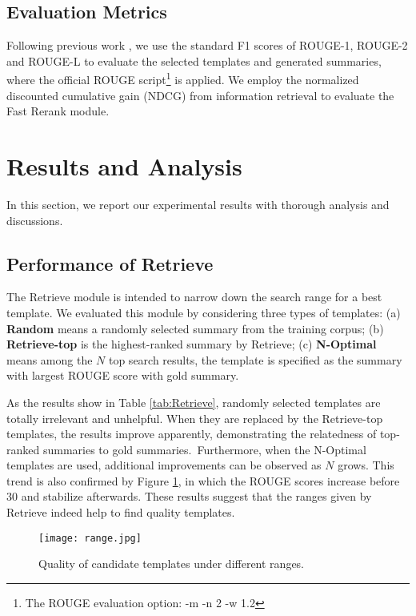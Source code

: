 \documentclass[11pt,a4paper]{article}
\begin{document}
\begin{spacing}{1.0}
\subsection{Evaluation Metrics}
Following previous work \cite{Nallapati2016Abstractive,Zhou2017Selective,cao2018retrieve}, we use the standard F1 scores of ROUGE-1, ROUGE-2 and ROUGE-L \cite{Lin2003Automatic} to evaluate the selected templates and generated summaries, where the official ROUGE script\footnote{The ROUGE evaluation option: -m -n 2 -w 1.2} is applied. We employ the normalized discounted cumulative gain (NDCG) \cite{jarvelin2002cumulated} from information retrieval to evaluate the Fast Rerank module.

\section{Results and Analysis}
In this section, we report our experimental results with thorough analysis and discussions.

\subsection{Performance of Retrieve}\label{sec:retrieve}
The Retrieve module is intended to narrow down the search range for a best template. We evaluated this module by considering three types of templates: (a) \noindent\textbf{Random} means a randomly selected summary from the training corpus; (b) \noindent\textbf{Retrieve-top} is the highest-ranked summary by Retrieve; (c) \noindent\textbf{N-Optimal} means among the $N$ top search results, the template is specified as the summary with largest ROUGE score with gold summary.

As the results show in Table \ref{tab:Retrieve}, randomly selected templates are totally irrelevant and unhelpful. When they are replaced by the Retrieve-top templates, the results improve apparently, demonstrating the relatedness of top-ranked summaries to gold summaries.~Furthermore, when the N-Optimal templates are used, additional improvements can be observed as $N$ grows. This trend is also confirmed by Figure \ref{img:data}, in which the ROUGE scores increase before 30 and stabilize afterwards. These results suggest that the ranges given by Retrieve indeed help to find quality templates.

\begin{figure}
\centering
\texttt{[image: range.jpg]}
\caption{Quality of candidate templates under different ranges. }
\label{img:data}
\end{figure}


\end{spacing}
\end{document}
